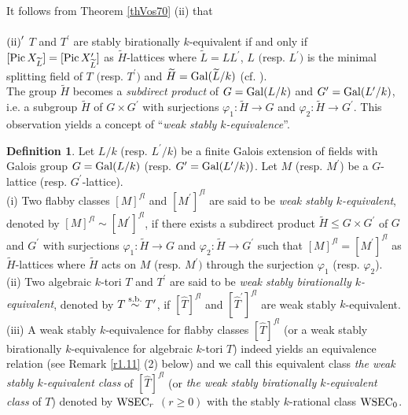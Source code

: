 \documentclass{amsart}
\theoremstyle{plain}
\theoremstyle{definition}
\newtheorem{definition}[theorem]{Definition}
\theoremstyle{remark}
\newcounter{sub}\def\tr{\mbox{tr }}
\begin{document}
It follows from Theorem \ref{thVos70} (ii) that\\~\\
${\rm (ii)}^\prime$ 
$T$ and $T^\prime$ are stably birationally $k$-equivalent 
if and only if 
$[{\rm Pic}\, X_{\widetilde{L}}]=[{\rm Pic}\, X^\prime_{\widetilde{L}}]$ 
as $\widetilde{H}$-lattices where 
$\widetilde{L}=LL^\prime$, 
$L$ $($resp. $L^\prime$$)$ 
is the minimal splitting field of $T$ $($resp. $T^\prime$$)$ 
and $\widetilde{H}={\rm Gal}(\widetilde{L}/k)$ 
(cf. \cite[Proposition 1]{Vos74}).\\

The group $\widetilde{H}$ becomes a 
{\it subdirect product} of $G={\rm Gal}(L/k)$ and 
$G^\prime={\rm Gal}(L^\prime/k)$, i.e. 
a subgroup $\widetilde{H}$ of $G\times G^\prime$ 
with surjections $\varphi_1:\widetilde{H}\rightarrow G$ and 
$\varphi_2:\widetilde{H}\rightarrow G^\prime$. 
%
This observation yields a concept of ``{\it weak stably $k$-equivalence}''.  
%
\begin{definition}\label{d1.10}
Let $L/k$ (resp. $L^\prime/k$) be a finite Galois extension of fields 
with Galois group $G={\rm Gal}(L/k)$ 
(resp. $G^\prime={\rm Gal}(L^\prime/k))$. 
Let $M$ (resp. $M^\prime$) be a $G$-lattice (resp. $G^\prime$-lattice).\\
{\rm (i)} Two flabby classes $[M]^{fl}$ and $[M^\prime]^{fl}$ are 
said to be {\it weak stably $k$-equivalent}, 
denoted by $[M]^{fl}\sim [M^\prime]^{fl}$, if 
there exists a subdirect product $\widetilde{H}\leq G\times G^\prime$ 
of $G$ and $G^\prime$ 
with surjections 
$\varphi_1:\widetilde{H}\rightarrow G$ and 
$\varphi_2:\widetilde{H}\rightarrow G^\prime$ 
such that $[M]^{fl}=[M^\prime]^{fl}$ 
as $\widetilde{H}$-lattices 
where $\widetilde{H}$ acts on $M$ (resp. $M^\prime)$ 
through the surjection $\varphi_1$ (resp. $\varphi_2$).\\
{\rm (ii)} Two algebraic $k$-tori $T$ and $T^\prime$ are 
said to be {\it weak stably birationally $k$-equivalent}, 
denoted by $T\stackrel{\rm s.b.}{\sim} T^\prime$, 
if $[\widehat{T}]^{fl}$ and $[\widehat{T}^\prime]^{fl}$ are 
weak stably $k$-equivalent.\\
{\rm (iii)} A weak stably $k$-equivalence for flabby classes 
$[\widehat{T}]^{fl}$ 
(or a weak stably birationally $k$-equivalence 
for algebraic $k$-tori $T$) indeed yields 
an equivalence relation (see Remark \ref{r1.11} (2) below) 
and we call this equivalent class {\it the weak stably $k$-equivalent 
class} of $[\widehat{T}]^{fl}$ (or {\it the weak stably birationally 
$k$-equivalent class} of $T$) 
denoted by ${\rm WSEC}_r$ $(r\geq 0)$ 
with the stably $k$-rational class ${\rm WSEC}_0$.
\end{definition}
\end{document}
